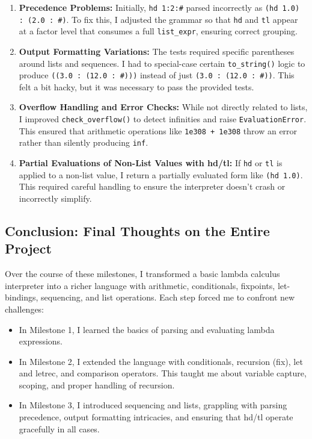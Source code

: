 \documentclass{article}
\theoremstyle{theorem}
\theoremstyle{definition}
\theoremstyle{remark}
\begin{document}
\begin{enumerate}
    \item \textbf{Precedence Problems:} Initially, \texttt{hd 1:2:\#} parsed incorrectly as \texttt{(hd 1.0) : (2.0 : \#)}. To fix this, I adjusted the grammar so that \texttt{hd} and \texttt{tl} appear at a factor level that consumes a full \texttt{list\_expr}, ensuring correct grouping.
    
    \item \textbf{Output Formatting Variations:} The tests required specific parentheses around lists and sequences. I had to special-case certain \texttt{to\_string()} logic to produce \texttt{((3.0 : (12.0 : \#)))} instead of just \texttt{(3.0 : (12.0 : \#))}. This felt a bit hacky, but it was necessary to pass the provided tests.

    \item \textbf{Overflow Handling and Error Checks:} While not directly related to lists, I improved \texttt{check\_overflow()} to detect infinities and raise \texttt{EvaluationError}. This ensured that arithmetic operations like \texttt{1e308 + 1e308} throw an error rather than silently producing \texttt{inf}.
    
    \item \textbf{Partial Evaluations of Non-List Values with hd/tl:} If \texttt{hd} or \texttt{tl} is applied to a non-list value, I return a partially evaluated form like \texttt{(hd 1.0)}. This required careful handling to ensure the interpreter doesn’t crash or incorrectly simplify.
\end{enumerate}

\subsection{Conclusion: Final Thoughts on the Entire Project}

Over the course of these milestones, I transformed a basic lambda calculus interpreter into a richer language with arithmetic, conditionals, fixpoints, let-bindings, sequencing, and list operations. Each step forced me to confront new challenges:

\begin{itemize}
    \item In Milestone 1, I learned the basics of parsing and evaluating lambda expressions.
    \item In Milestone 2, I extended the language with conditionals, recursion (fix), let and letrec, and comparison operators. This taught me about variable capture, scoping, and proper handling of recursion.
    \item In Milestone 3, I introduced sequencing and lists, grappling with parsing precedence, output formatting intricacies, and ensuring that hd/tl operate gracefully in all cases.
\end{itemize}
\end{document}

